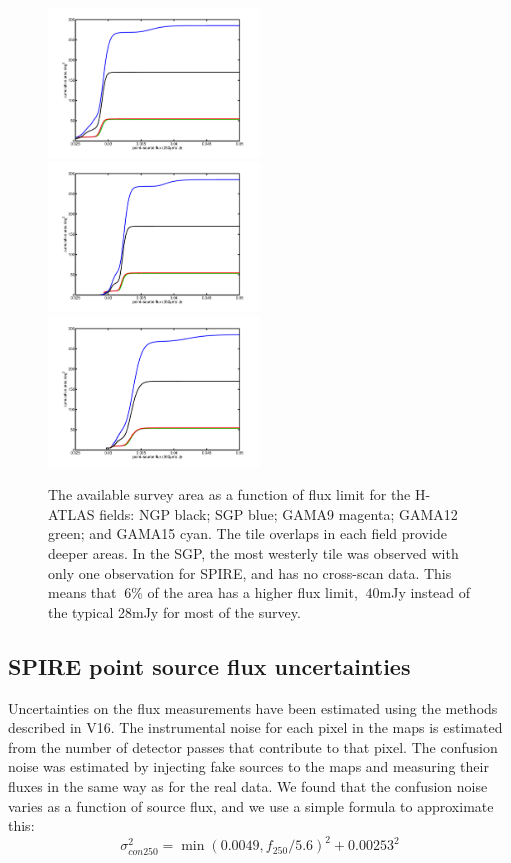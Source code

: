 \documentclass[useAMS,usenatbib]{mn2e}
\begin{document}
\begin{figure} %
\includegraphics[width=0.5\textwidth]{flux_area_250.pdf}
\includegraphics[width=0.5\textwidth]{flux_area_350.pdf}
\includegraphics[width=0.5\textwidth]{flux_area_500.pdf}
\caption{The available survey area as a function of flux limit for the
  H-ATLAS fields: NGP black; SGP blue; GAMA9 magenta; GAMA12 green;
  and GAMA15 cyan.  The tile overlaps in each field provide deeper
  areas.  In the SGP, the most westerly tile was observed with only
  one observation for SPIRE, and has no cross-scan data. This means
  that $~6$\% of the area has a higher flux limit, $~40$mJy instead of
  the typical 28mJy for most of the survey. }

\label{fig_areas}
\end{figure}

\subsection{SPIRE point source flux uncertainties} 
Uncertainties on the flux measurements have been estimated using the
methods described in V16. The instrumental noise for each pixel in the
maps is estimated from the number of detector passes that contribute
to that pixel. The confusion noise was estimated by injecting fake
sources to the maps and measuring their fluxes in the same way as for
the real data. We found that the confusion noise varies as a function
of source flux, and we use a simple formula to approximate this:
\begin{equation} 
\sigma_{con250}^2 = \min(0.0049,f_{250}/5.6)^2 + 0.00253^2
\end{equation}
\end{document}
